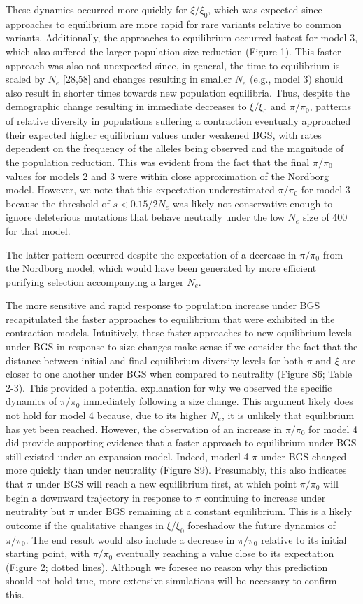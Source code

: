 \documentclass[9pt,twocolumn,twoside]{rilabRxiv}
\begin{document}
 These dynamics occurred more quickly for
$\xi/\xi_0$, which was expected since approaches to equilibrium
are more rapid for rare variants relative to common variants.
Additionally, the approaches to equilibrium occurred fastest for model
3, which also suffered the larger population size reduction (Figure 1).
This faster approach was also not unexpected since, in general, the time
to equilibrium is scaled by $N_e$ [28,58] and
changes resulting in smaller $N_e$ (e.g., model 3)
should also result in shorter times towards new population equilibria.
Thus, despite the demographic change resulting in immediate decreases to
$\xi/\xi_0$ and $\pi/\pi_0$, patterns of relative
diversity in populations suffering a contraction eventually approached
their expected higher equilibrium values under weakened BGS, with rates
dependent on the frequency of the alleles being observed and the
magnitude of the population reduction. This was evident from the fact
that the final $\pi/\pi_0$ values for models 2 and 3 were
within close approximation of the Nordborg model. However, we note that
this expectation underestimated $\pi/\pi_0$ for model 3 because
the threshold of $s < 0.15/2N_e$
was likely not conservative enough to ignore deleterious mutations that
behave neutrally under the low $N_e$ size of 400 for
that model.


The latter pattern occurred despite the
expectation of a decrease in $\pi/\pi_0$ from the Nordborg
model, which would have been generated by more efficient purifying
selection accompanying a larger $N_e$.

The more sensitive and rapid response to population increase under BGS
recapitulated the faster approaches to equilibrium that were exhibited
in the contraction models. Intuitively, these faster approaches to new
equilibrium levels under BGS in response to size changes make sense if
we consider the fact that the distance between initial and final
equilibrium diversity levels for both $\pi$ and $\xi$ are closer to one another
under BGS when compared to neutrality (Figure S6; Table 2-3). This
provided a potential explanation for why we observed the specific
dynamics of $\pi/\pi_0$ immediately following a size change.
This argument likely does not hold for model 4 because, due to its
higher $N_e$, it is unlikely that equilibrium has
yet been reached. However, the observation of an increase in
$\pi/\pi_0$ for model 4 did provide supporting evidence that a
faster approach to equilibrium under BGS still existed under an
expansion model. Indeed, moderl 4 $\pi$ under BGS changed more quickly than
under neutrality (Figure S9). Presumably, this also indicates that $\pi$
under BGS will reach a new equilibrium first, at which point
$\pi/\pi_0$ will begin a downward trajectory in response to $\pi$
continuing to increase under neutrality but $\pi$ under BGS remaining at a
constant equilibrium. This is a likely outcome if the qualitative
changes in $\xi/\xi_0$ foreshadow the future dynamics of
$\pi/\pi_0$. The end result would also include a decrease in
$\pi/\pi_0$ relative to its initial starting point, with
$\pi/\pi_0$ eventually reaching a value close to its
expectation (Figure 2; dotted lines). Although we foresee no reason why
this prediction should not hold true, more extensive simulations will be
necessary to confirm this.
\end{document}
